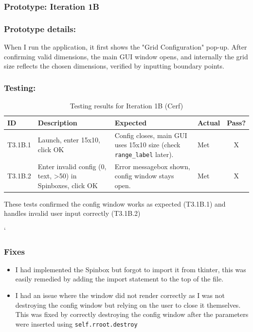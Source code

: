 \newpage
\subsubsection*{Prototype: Iteration 1B}



\newpage

\subsubsection{Prototype details:}
When I run the application, it first shows the "Grid Configuration" pop-up. After confirming valid dimensions, the main GUI window opens, and internally the grid size reflects the chosen dimensions, verified by inputting boundary points.

\subsubsection{Testing:}
\begin{table}[htbp]
	\centering
	\begin{tabularx}{\textwidth}{|l|X|p{4.5cm}|p{1.5cm}|c|}
		\hline
		\textbf{ID} & \textbf{Description} & \textbf{Expected} & \textbf{Actual} & \textbf{Pass?} \\
		\hline
		T3.1B.1 & Launch, enter 15x10, click OK & Config closes, main GUI uses 15x10 size (check \verb|range_label| later). & Met & X \\
		\hline
		T3.1B.2 & Enter invalid config (0, text, >50) in Spinboxes, click OK & Error messagebox shown, config window stays open. & Met & X \\
		\hline
	\end{tabularx}
	\caption{Testing results for Iteration 1B (Cerf)}
\end{table}
These tests confirmed the config window works as expected (T3.1B.1) and handles invalid user input correctly (T3.1B.2)

`
\subsubsection{Fixes}
\begin{itemize}
	\item I had implemented the Spinbox but forgot to import it from tkinter, this was easily remedied by adding the import statement to the top of the file.
	\item I had an issue where the window did not render correctly as I was not destroying the config window but relying on the user to close it themselves. This was fixed by correctly destroying the config window after the parameters were inserted using \verb|self.rroot.destroy|
\end{itemize}

